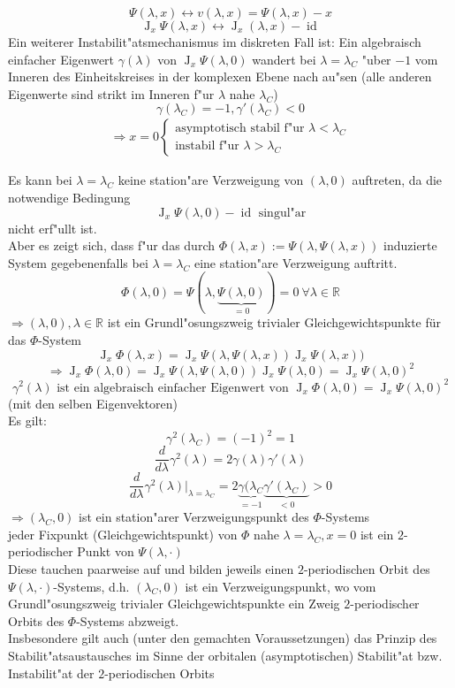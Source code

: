 \documentclass[a4paper, 13pt]{scrreprt}
\theoremstyle{definition} \newtheorem{definition}{Definition}[section]
\newenvironment{bemerkung}[1][Bemerkung]{\begin{trivlist}
\item[\hskip \labelsep {\bfseries #1}]}{\end{trivlist}}
\begin{document}
\[\Psi(\lambda,x)\leftrightarrow v(\lambda,x)=\Psi(\lambda,x)-x\]
\[\operatorname{J}_x\Psi(\lambda,x)\leftrightarrow\operatorname{J}_x(\lambda,x)-\operatorname{id}\]
Ein weiterer Instabilit"atsmechanismus im diskreten Fall ist: Ein algebraisch einfacher Eigenwert $\gamma(\lambda)$ von $\operatorname{J}_x\Psi(\lambda,0)$ wandert bei $\lambda=\lambda_C$ "uber $-1$ vom Inneren des Einheitskreises in der komplexen Ebene nach au"sen (alle anderen Eigenwerte sind strikt im Inneren f"ur $\lambda$ nahe $\lambda_C$)
\[\gamma(\lambda_C)=-1, \gamma'(\lambda_C)<0\]
\begin{align*}
\Rightarrow x=0\begin{cases} \text{asymptotisch stabil f"ur } \lambda<\lambda_C\\
\text{instabil f"ur } \lambda>\lambda_C\end{cases}
\end{align*}

\begin{bemerkung}
Es kann bei $\lambda=\lambda_C$ keine station"are Verzweigung von $(\lambda,0)$ auftreten, da die notwendige Bedingung 
\[\operatorname{J}_x\Psi(\lambda,0)-\operatorname{id}\text{ singul"ar}\]
nicht erf"ullt ist.\\
Aber es zeigt sich, dass f"ur das durch $\Phi(\lambda,x):=\Psi(\lambda,\Psi(\lambda,x))$ induzierte System gegebenenfalls bei $\lambda=\lambda_C$ eine station"are Verzweigung auftritt.
\[\Phi(\lambda,0)=\Psi(\lambda,\underbrace{\Psi(\lambda,0)}_{=0})=0\ \forall\lambda\in\mathbb{R}\]
$\Rightarrow (\lambda,0), \lambda\in\mathbb{R}$ ist ein Grundl"osungszweig trivialer Gleichgewichtspunkte für das $\Phi$-System
\[\operatorname{J}_x\Phi(\lambda,x)=\operatorname{J}_x\Psi(\lambda,\Psi(\lambda,x))\operatorname{J}_x\Psi(\lambda,x))\]
\[\Rightarrow \operatorname{J}_x\Phi(\lambda,0)=\operatorname{J}_x\Psi(\lambda,\Psi(\lambda,0))\operatorname{J}_x\Psi(\lambda,0)=\operatorname{J}_x\Psi(\lambda,0)^2\]
\[\gamma^2(\lambda) \text{ ist ein algebraisch einfacher Eigenwert von } \operatorname{J}_x\Phi(\lambda,0)=\operatorname{J}_x\Psi(\lambda,0)^2\]
(mit den selben Eigenvektoren)\\
Es gilt:
\[\gamma^2(\lambda_C)=(-1)^2=1\]
\[\frac d {d\lambda}\gamma^2(\lambda)=2\gamma(\lambda)\gamma'(\lambda)\]
\[\frac d {d\lambda}\gamma^2(\lambda)|_{\lambda=\lambda_C}=2\underbrace{\gamma(\lambda_C}_{=-1}\underbrace{\gamma'(\lambda_C)}_{<0}>0\]
$\Rightarrow (\lambda_C,0)$ ist ein station"arer Verzweigungspunkt des $\Phi$-Systems\\
jeder Fixpunkt (Gleichgewichtspunkt) von $\Phi$ nahe $\lambda=\lambda_C, x=0$ ist ein $2$-periodischer Punkt von $\Psi(\lambda,\cdot)$\\
Diese tauchen paarweise auf und bilden jeweils einen $2$-periodischen Orbit des $\Psi(\lambda,\cdot)$-Systems, d.h. $(\lambda_C,0)$ ist ein Verzweigungspunkt, wo vom Grundl"osungszweig trivialer Gleichgewichtspunkte ein Zweig $2$-periodischer Orbits des $\Phi$-Systems abzweigt.\\
Insbesondere gilt auch (unter den gemachten Voraussetzungen) das Prinzip des Stabilit"atsaustausches im Sinne der orbitalen (asymptotischen) Stabilit"at bzw. Instabilit"at der $2$-periodischen Orbits
\end{bemerkung}
\end{document}
